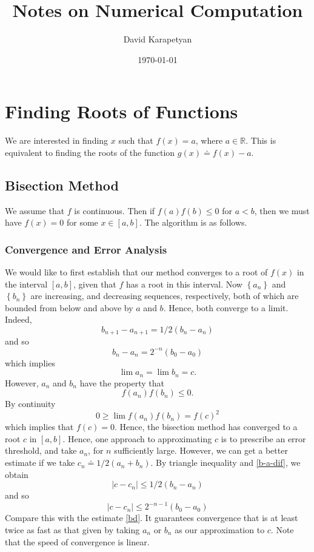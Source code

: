 \documentclass[12pt,reqno]{amsart}
\numberwithin{equation}{section}  %
\newcommand{\rr}{\mathbb{R}}
\begin{document}
\title{Notes on Numerical Computation }
\author{David Karapetyan}
\date{\today}
%
\maketitle
%
%
%
%
\section{Finding Roots of Functions}
We are interested in finding $x$ such that
$f(x) = a$, where $a \in \rr$. This is equivalent to finding
the roots of the function $g(x) \doteq f(x) - a$.
\subsection{Bisection Method}
We assume that $f$ is continuous. Then if $f(a)f(b) \le 0$ for $a < b$,
then we must have $f(x) = 0$ for some $x \in [a,b]$. The algorithm is as follows.
\subsubsection{Convergence and Error Analysis} 
We would like to first establish that our method converges to a root of
$f(x)$ in the interval $[a,b]$, given that $f$ has a root in this interval.
Now $ \left\{ a_n \right\} $ and $ \left\{ b_n \right\}  $ 
are increasing, and decreasing sequences, respectively, both of which
are bounded from below and above by $a$ and $b$. Hence, both converge
to a limit. Indeed,
\begin{equation}
\label{b-a-dif}
 b_{n+1} - a_{n+1} = 1/2(b_n - a_n)
\end{equation}
and so
\begin{equation}
\label{bd}
b_{n} - a_{n} = 2^{-n}(b_0 - a_0)
\end{equation}
which implies
\begin{equation*}
\lim a_n = \lim b_{n} = c.
\end{equation*}
However, $a_n$ and $b_n$ have the property that
\begin{equation*}
f(a_n)f(b_n) \le 0.
\end{equation*}
By continuity
\begin{equation*}
0 \ge \lim f(a_n)f(b_n) = f(c)^2
\end{equation*}
which implies that $f(c) = 0$. Hence, the bisection method has converged to a root
$c$ in $[a,b]$.
Hence, one approach to approximating $c$ is to prescribe an error threshold, and
take $a_n$, for $n$ sufficiently large. However, we can get a better estimate
if we take $c_n \doteq 1/2(a_n + b_n)$. By triangle inequality and \eqref{b-a-dif}, we obtain
\begin{equation*}
|c - c_n| \le 1/2 (b_n - a_n)
\end{equation*}
and so
\begin{equation*}
|c - c_n| \le 2^{-n - 1}(b_0 - a_0)
\end{equation*}
Compare this with the estimate \eqref{bd}. It guarantees convergence
that is at least twice as fast as that given by taking $a_n$ or $b_n$
as our approximation to $c$. Note that the speed of convergence is linear.
\end{document}
